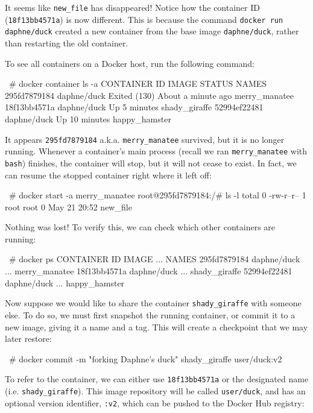 \documentclass[12pt,initial,twoside,maitrise]{dms}
\def\inline{\lstinline[basicstyle=\ttfamily]}
\numberwithin{equation}{section}
\numberwithin{table}{chapter}
\numberwithin{figure}{chapter}
\begin{document}
It seems like \inline{new_file} has disappeared! Notice how the container ID (\inline{18f13bb4571a}) is now different. This is because the command \inline{docker run daphne/duck} created a new container from the base image \inline{daphne/duck}, rather than restarting the old container.

To see all containers on a Docker host, run the following command:

\begin{pclisting}
~# docker container ls -a
CONTAINER ID  IMAGE        STATUS                           NAMES
295fd7879184  daphne/duck  Exited (130) About a minute ago  merry_manatee
18f13bb4571a  daphne/duck  Up 5 minutes                     shady_giraffe
52994ef22481  daphne/duck  Up 10 minutes                    happy_hamster
\end{pclisting}

It appears \inline{295fd7879184} a.k.a. \inline{merry_manatee} survived, but it is no longer running. Whenever a container’s main process (recall we ran \inline{merry_manatee} with \inline{bash}) finishes, the container will stop, but it will not cease to exist. In fact, we can resume the stopped container right where it left off:

\begin{pclisting}
~# docker start -a merry_manatee
root@295fd7879184:/# ls -l
total 0
-rw-r--r-- 1 root root 0 May 21 20:52 new_file
\end{pclisting}

Nothing was lost! To verify this, we can check which other containers are running:

\begin{pclisting}
~# docker ps
CONTAINER ID     IMAGE           ...     NAMES
295fd7879184     daphne/duck     ...     merry_manatee
18f13bb4571a     daphne/duck     ...     shady_giraffe
52994ef22481     daphne/duck     ...     happy_hamster
\end{pclisting}

Now suppose we would like to share the container \inline{shady_giraffe} with someone else. To do so, we must first snapshot the running container, or commit it to a new image, giving it a name and a tag. This will create a checkpoint that we may later restore:

\begin{pclisting}
~# docker commit -m "forking Daphne's duck" shady_giraffe user/duck:v2
\end{pclisting}

To refer to the container, we can either use \inline{18f13bb4571a} or the designated name (i.e. \inline{shady_giraffe}). This image repository will be called \inline{user/duck}, and has an optional version identifier, \inline{:v2}, which can be pushed to the Docker Hub registry:
\end{document}
